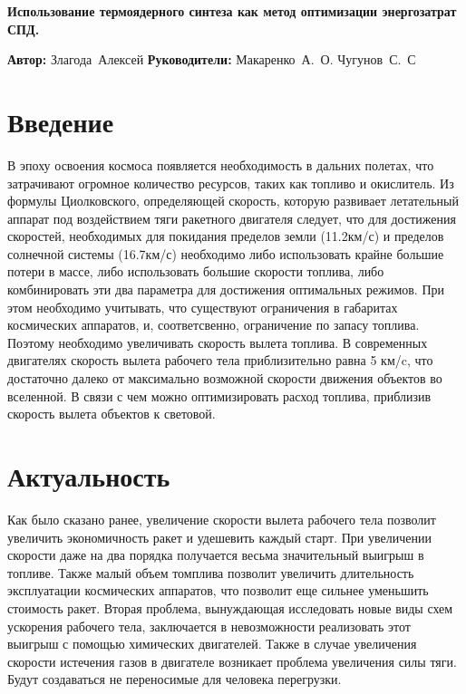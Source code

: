 \documentclass[a4paper,11pt]{article}
\begin{document}
\begin{center}
    \Huge \bf Использование термоядерного синтеза как метод оптимизации энергозатрат СПД.
\end{center}
\hfill\Large
\vbox{%
\hfill%
\vbox{%
\hbox{\textbf{Автор:}}%
\hbox{Злагода Алексей}%
\hbox{\textbf{Руководители:}}%
\hbox{Макаренко А. О.}%
\hbox{Чугунов С. С}%
}%
} 

\section{\Large  Введение}

\indent
В эпоху освоения космоса появляется необходимость в дальних полетах, что затрачивают огромное количество ресурсов, таких как топливо и окислитель.
Из формулы Циолковского, определяющей скорость, которую развивает летательный аппарат под воздействием тяги ракетного двигателя
следует, что для достижения скоростей, необходимых для покидания пределов земли 
 (11.2км/с)
 и пределов солнечной системы 
 (16.7км/с)
 необходимо либо использовать крайне большие потери в массе, либо использовать большие скорости топлива, либо комбинировать эти два параметра для достижения оптимальных режимов.   
При этом необходимо учитывать, что существуют ограничения в габаритах космических аппаратов, и, соответсвенно, ограничение по запасу топлива. Поэтому необходимо увеличивать скорость вылета топлива. 
\newline
\indent
В современных двигателях скорость вылета рабочего тела приблизительно равна 5 км/c, что достаточно далеко от максимально возможной скорости движения объектов во вселенной. В связи с чем можно оптимизировать расход топлива, приблизив скорость вылета объектов к световой.




\section{\Large Актуальность} 
Как было сказано ранее, увеличение скорости вылета рабочего тела позволит увеличить экономичность ракет и удешевить каждый старт. 
При увеличении скорости даже на два порядка получается весьма значительный выигрыш в топливе.
Также малый объем томплива позволит увеличить длительность эксплуатации космических аппаратов, что позволит еще сильнее уменьшить стоимость ракет.  
\newline
\indent
Вторая проблема, вынуждающая исследовать новые виды схем ускорения рабочего тела, заключается в невозможности реализовать этот выигрыш с помощью химических двигателей. 
Также в случае увеличения скорости истечения газов в двигателе возникает проблема увеличения силы тяги. Будут создаваться не переносимые для человека перегрузки. 
\end{document}
